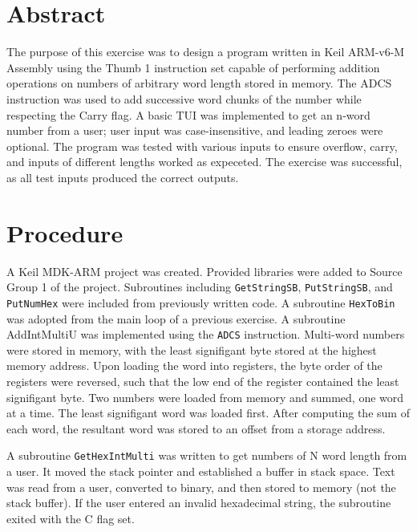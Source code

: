 \documentclass[CMPE]{KGCOEReport}
\begin{document}
\maketitle

\section*{Abstract}

The purpose of this exercise was to design a program written in Keil ARM-v6-M
Assembly using the Thumb 1 instruction set capable of performing addition
operations on numbers of arbitrary word length stored in memory. The ADCS
instruction was used to add successive word chunks of the number while
respecting the Carry flag. A basic TUI was implemented to get an n-word number
from a user; user input was case-insensitive, and leading zeroes were optional.
The program was tested with various inputs to ensure overflow, carry, and
inputs of different lengths worked as expeceted. The exercise was successful,
as all test inputs produced the correct outputs.

\section*{Procedure}

A Keil MDK-ARM project was created. Provided libraries were added to Source
Group 1 of the project. Subroutines including \texttt{GetStringSB},
\texttt{PutStringSB}, and \texttt{PutNumHex} were included from previously
written code. A subroutine \texttt{HexToBin} was adopted from the main loop
of a previous exercise. A subroutine AddIntMultiU was implemented using the
\texttt{ADCS} instruction. Multi-word numbers were stored in memory, with the
least signifigant byte stored at the highest memory address. Upon loading the
word into registers, the byte order of the registers were reversed, such that
the low end of the register contained the least signifigant byte. Two numbers
were loaded from memory and summed, one word at a time. The least signifigant
word was loaded first. After computing the sum of each word, the resultant word
was stored to an offset from a storage address.

A subroutine \texttt{GetHexIntMulti} was written to get numbers of N word
length from a user. It moved the stack pointer and established a buffer in
stack space. Text was read from a user, converted to binary, and then stored to
memory (not the stack buffer). If the user entered an invalid hexadecimal
string, the subroutine exited with the C flag set.
\end{document}
